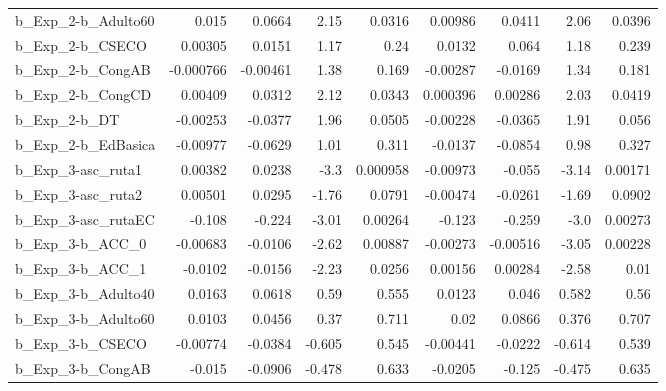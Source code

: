 \begin{tabular}{lrrrrrrrr}
b\_Exp\_2-b\_Adulto60         &       0.015 &       0.0664 &     2.15 &   0.0316 &    0.00986 &      0.0411 &         2.06 &        0.0396 \\
b\_Exp\_2-b\_CSECO            &     0.00305 &       0.0151 &     1.17 &     0.24 &     0.0132 &       0.064 &         1.18 &         0.239 \\
b\_Exp\_2-b\_CongAB           &   -0.000766 &     -0.00461 &     1.38 &    0.169 &   -0.00287 &     -0.0169 &         1.34 &         0.181 \\
b\_Exp\_2-b\_CongCD           &     0.00409 &       0.0312 &     2.12 &   0.0343 &   0.000396 &     0.00286 &         2.03 &        0.0419 \\
b\_Exp\_2-b\_DT               &    -0.00253 &      -0.0377 &     1.96 &   0.0505 &   -0.00228 &     -0.0365 &         1.91 &         0.056 \\
b\_Exp\_2-b\_EdBasica         &    -0.00977 &      -0.0629 &     1.01 &    0.311 &    -0.0137 &     -0.0854 &         0.98 &         0.327 \\
b\_Exp\_3-asc\_ruta1          &     0.00382 &       0.0238 &     -3.3 & 0.000958 &   -0.00973 &      -0.055 &        -3.14 &       0.00171 \\
b\_Exp\_3-asc\_ruta2          &     0.00501 &       0.0295 &    -1.76 &   0.0791 &   -0.00474 &     -0.0261 &        -1.69 &        0.0902 \\
b\_Exp\_3-asc\_rutaEC         &      -0.108 &       -0.224 &    -3.01 &  0.00264 &     -0.123 &      -0.259 &         -3.0 &       0.00273 \\
b\_Exp\_3-b\_ACC\_0            &    -0.00683 &      -0.0106 &    -2.62 &  0.00887 &   -0.00273 &    -0.00516 &        -3.05 &       0.00228 \\
b\_Exp\_3-b\_ACC\_1            &     -0.0102 &      -0.0156 &    -2.23 &   0.0256 &    0.00156 &     0.00284 &        -2.58 &          0.01 \\
b\_Exp\_3-b\_Adulto40         &      0.0163 &       0.0618 &     0.59 &    0.555 &     0.0123 &       0.046 &        0.582 &          0.56 \\
b\_Exp\_3-b\_Adulto60         &      0.0103 &       0.0456 &     0.37 &    0.711 &       0.02 &      0.0866 &        0.376 &         0.707 \\
b\_Exp\_3-b\_CSECO            &    -0.00774 &      -0.0384 &   -0.605 &    0.545 &   -0.00441 &     -0.0222 &       -0.614 &         0.539 \\
b\_Exp\_3-b\_CongAB           &      -0.015 &      -0.0906 &   -0.478 &    0.633 &    -0.0205 &      -0.125 &       -0.475 &         0.635 \\

\end{tabular}
